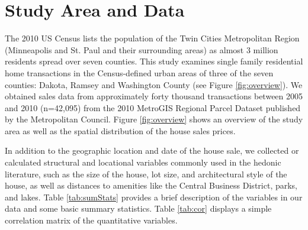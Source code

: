 \documentclass{article}\usepackage{graphicx, color}
\begin{document}
\section{Study Area and Data}
The 2010 US Census lists the population of the Twin Cities Metropolitan Region (Minneapolis and St. Paul and their surrounding areas) as almost 3 million residents spread over seven counties. This study examines single family residential home transactions in the Census-defined urban areas of three of the seven counties: Dakota, Ramsey and Washington County (see Figure \ref{fig:overview}). We obtained sales data from approximately forty thousand transactions between 2005 and 2010 (n=42,095) from the 2010 MetroGIS Regional Parcel Dataset published by the Metropolitan Council. Figure \ref{fig:overview} shows an overview of the study area as well as the spatial distribution of the house sales prices. 

In addition to the geographic location and date of the house sale, we collected or calculated structural and locational variables commonly used in the hedonic literature, such as the size of the house, lot size, and architectural style of the house, as well as distances to amenities like the Central Business District, parks, and lakes. Table \ref{tab:sumStats} provides a brief description of the variables in our data and some basic summary statistics. Table \ref{tab:cor} displays a simple correlation matrix of the quantitative variables.
\end{document}
